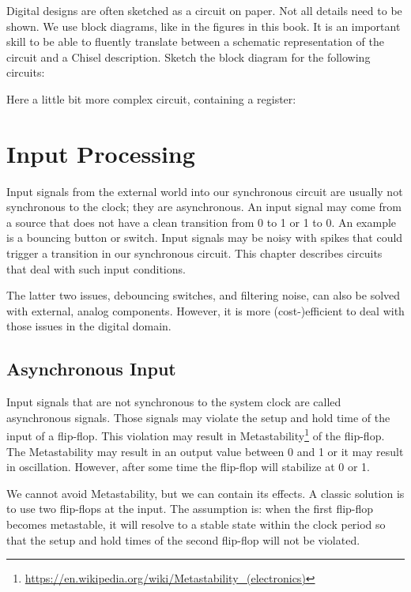 \documentclass[%
    10pt,
    headinclude, footexclude,
    openright, %
    notitlepage,
    cleardoubleempty,
    headsepline,
    pointlessnumbers,
    bibtotoc, idxtotoc,
    ]{scrbook}
\newcommand{\todo}[1]{{\emph{TODO: #1}}}
\newcommand{\myref}[2]{\href{#1}{#2}}
\renewcommand{\myref}[2]{{#2}{\footnote{\url{#1}}}}
\renewcommand{\todo}[1]{}
\begin{document}
Digital designs are often sketched as a circuit on paper. Not all details need to be shown.
We use block diagrams, like in the figures in this book. It is an important skill to be able
to fluently translate between a schematic representation of the circuit and a Chisel description.
Sketch the block diagram for the following circuits:


\noindent Here a little bit more complex circuit, containing a register:


\todo{Luca: More exercises would be nice. Maybe in the future?}

\chapter{Input Processing}

Input signals from the external world into our synchronous circuit are usually
not synchronous to the clock; they are asynchronous.
An input signal may come from a source that does not have a clean transition from
0 to 1 or 1 to 0. An example is a bouncing button or switch.
Input signals may be noisy with spikes that could trigger a transition in our
synchronous circuit. This chapter describes circuits that deal with such input
conditions.

The latter two issues, debouncing switches, and filtering noise, can also be
solved with external, analog components. However, it is more (cost-)efficient
to deal with those issues in the digital domain.

\section{Asynchronous Input}


\todo{read Dally on this topic to check for correct wording and facts.}

Input signals that are not synchronous to the system clock are called
asynchronous signals. Those signals may violate the setup and hold time
of the input of a flip-flop. This violation may result in
\myref{https://en.wikipedia.org/wiki/Metastability_(electronics)}{Metastability}
of the flip-flop. The Metastability may result in an output value between 0 and
1 or it may result in oscillation. However, after some time the flip-flop will
stabilize at 0 or 1.

We cannot avoid Metastability, but we can contain its effects.
A classic solution is to use two flip-flops at the input. The assumption is:
when the first flip-flop becomes metastable, it will resolve to a stable
state within the clock period so that the setup and hold times of the
second flip-flop will not be violated.
\end{document}
